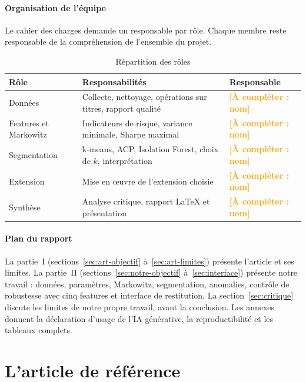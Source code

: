 \documentclass[11pt,a4paper]{article}
\newcommand{\afaire}[1]{\textcolor{orange}{\textbf{[À compléter : #1]}}}
\begin{document}
\subsection{Organisation de l'équipe}
Le cahier des charges demande un responsable par rôle. Chaque membre reste responsable de la compréhension de l'ensemble du projet.

\begin{table}[H]\centering\small
\caption{Répartition des rôles}\label{tab:roles}
\begin{tabular}{lp{7.5cm}l}\toprule
Rôle & Responsabilités & Responsable \\ \midrule
Données & Collecte, nettoyage, opérations sur titres, rapport qualité & \afaire{nom} \\
Features et Markowitz & Indicateurs de risque, variance minimale, Sharpe maximal & \afaire{nom} \\
Segmentation & k-means, ACP, Isolation Forest, choix de $k$, interprétation & \afaire{nom} \\
Extension & Mise en œuvre de l'extension choisie & \afaire{nom} \\
Synthèse & Analyse critique, rapport \LaTeX{} et présentation & \afaire{nom} \\
\bottomrule\end{tabular}
\end{table}

\subsection{Plan du rapport}
La partie~I (sections~\ref{sec:art-objectif} à~\ref{sec:art-limites}) présente l'article et ses limites. La partie~II (sections~\ref{sec:notre-objectif} à~\ref{sec:interface}) présente notre travail : données, paramètres, Markowitz, segmentation, anomalies, contrôle de robustesse avec cinq features et interface de restitution. La section~\ref{sec:critique} discute les limites de notre propre travail, avant la conclusion. Les annexes donnent la déclaration d'usage de l'IA générative, la reproductibilité et les tableaux complets.

\part{L'article de référence}
\end{document}
